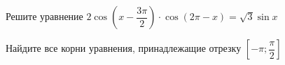 \begin{ex}
	\begin{condition}
		\begin{enumcols}[label=\asbuk*)]
			\item Решите уравнение \( 2\cos{\left(x - \dfrac{3\pi}{2}\right)}\cdot\cos(2\pi - x) = \sqrt{3}\sin x \)
			\item Найдите все корни уравнения, принадлежащие отрезку \( \left[-\pi;\dfrac{\pi}{2}\right] \)
		\end{enumcols}
	\end{condition}
\end{ex}